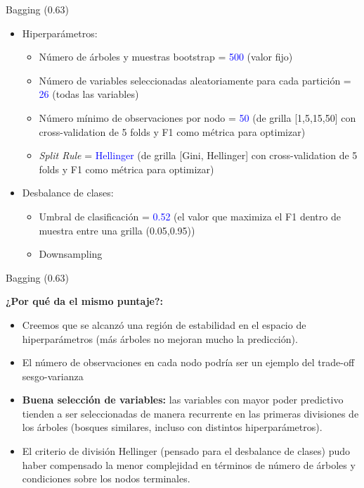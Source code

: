 \documentclass[11pt]{beamer}
\begin{document}
\begin{frame}{Bagging (0.63)}
\begin{itemize}
    \item Hiperparámetros:
\begin{itemize}
    \item Número de árboles y muestras bootstrap = \textcolor{blue}{500} (valor fijo)
    \item Número de variables seleccionadas aleatoriamente para cada partición = \textcolor{blue}{26} (todas las variables)
    \item Número mínimo de observaciones por nodo = \textcolor{blue}{50} (de grilla [1,5,15,50] con cross-validation de 5 folds y F1 como métrica para optimizar)
    \item \textit{Split Rule} = \textcolor{blue}{Hellinger} (de grilla [Gini, Hellinger] con cross-validation de 5 folds y F1 como métrica para optimizar)
\end{itemize}
\item Desbalance de clases: 
\begin{itemize}
    \item Umbral de clasificación = \textcolor{blue}{0.52} (el valor que maximiza el F1 dentro de muestra entre una grilla (0.05,0.95))
    \item Downsampling
\end{itemize}
\end{itemize}
\end{frame}

\begin{frame}{Bagging (0.63)}
    \item \textbf{¿Por qué da el mismo puntaje?:}
    \begin{itemize}
        \item Creemos que se alcanzó una región de estabilidad en el espacio de hiperparámetros (más árboles no mejoran mucho la predicción).
        \item El número de observaciones en cada nodo podría ser un ejemplo del trade-off sesgo-varianza
        \item \textbf{Buena selección de variables:} las variables con mayor poder predictivo tienden a ser seleccionadas de manera recurrente en las primeras divisiones de los árboles (bosques similares, incluso con distintos hiperparámetros). 
        \item El criterio de división Hellinger (pensado para el desbalance de clases) pudo haber compensado la menor complejidad en términos de número de árboles y condiciones sobre los nodos terminales.
    \end{itemize}
\end{frame}
\end{document}

